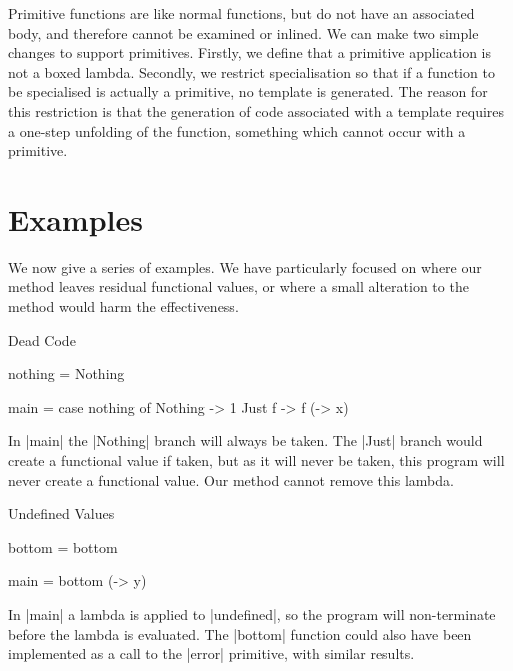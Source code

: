 \documentclass[preprint]{sigplanconf}
\begin{document}
Primitive functions are like normal functions, but do not have an associated body, and therefore cannot be examined or inlined. We can make two simple changes to support primitives. Firstly, we define that a primitive application is not a boxed lambda. Secondly, we restrict specialisation so that if a function to be specialised is actually a primitive, no template is generated. The reason for this restriction is that the generation of code associated with a template requires a one-step unfolding of the function, something which cannot occur with a primitive.

\section{Examples}
\label{sec:examples}

We now give a series of examples. We have particularly focused on where our method leaves residual functional values, or where a small alteration to the method would harm the effectiveness.

\begin{examplename}{Dead Code}
\begin{code}
nothing = Nothing

main = case  nothing of
             Nothing  -> 1
             Just f   -> f (\x -> x)
\end{code}

In |main| the |Nothing| branch will always be taken. The |Just| branch would create a functional value if taken, but as it will never be taken, this program will never create a functional value. Our method cannot remove this lambda.
\end{examplename}

\begin{examplename}{Undefined Values}
\label{ex:undefined_values}
\begin{code}
bottom = bottom

main = bottom (\y -> y)
\end{code}

In |main| a lambda is applied to |undefined|, so the program will non-terminate before the lambda is evaluated. The |bottom| function could also have been implemented as a call to the |error| primitive, with similar results.
\end{examplename}
\end{document}

